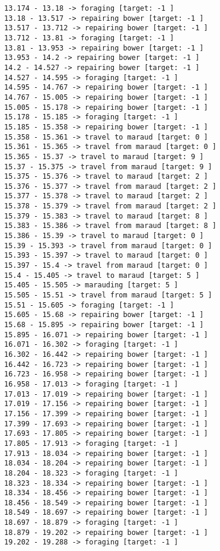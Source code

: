 \documentclass[11pt]{article}
\begin{document}
\begin{Verbatim}[commandchars=\\\{\}]
13.174 - 13.18 -> foraging [target: -1 ]
13.18 - 13.517 -> repairing bower [target: -1 ]
13.517 - 13.712 -> repairing bower [target: -1 ]
13.712 - 13.81 -> foraging [target: -1 ]
13.81 - 13.953 -> repairing bower [target: -1 ]
13.953 - 14.2 -> repairing bower [target: -1 ]
14.2 - 14.527 -> repairing bower [target: -1 ]
14.527 - 14.595 -> foraging [target: -1 ]
14.595 - 14.767 -> repairing bower [target: -1 ]
14.767 - 15.005 -> repairing bower [target: -1 ]
15.005 - 15.178 -> repairing bower [target: -1 ]
15.178 - 15.185 -> foraging [target: -1 ]
15.185 - 15.358 -> repairing bower [target: -1 ]
15.358 - 15.361 -> travel to maraud [target: 0 ]
15.361 - 15.365 -> travel from maraud [target: 0 ]
15.365 - 15.37 -> travel to maraud [target: 9 ]
15.37 - 15.375 -> travel from maraud [target: 9 ]
15.375 - 15.376 -> travel to maraud [target: 2 ]
15.376 - 15.377 -> travel from maraud [target: 2 ]
15.377 - 15.378 -> travel to maraud [target: 2 ]
15.378 - 15.379 -> travel from maraud [target: 2 ]
15.379 - 15.383 -> travel to maraud [target: 8 ]
15.383 - 15.386 -> travel from maraud [target: 8 ]
15.386 - 15.39 -> travel to maraud [target: 0 ]
15.39 - 15.393 -> travel from maraud [target: 0 ]
15.393 - 15.397 -> travel to maraud [target: 0 ]
15.397 - 15.4 -> travel from maraud [target: 0 ]
15.4 - 15.405 -> travel to maraud [target: 5 ]
15.405 - 15.505 -> marauding [target: 5 ]
15.505 - 15.51 -> travel from maraud [target: 5 ]
15.51 - 15.605 -> foraging [target: -1 ]
15.605 - 15.68 -> repairing bower [target: -1 ]
15.68 - 15.895 -> repairing bower [target: -1 ]
15.895 - 16.071 -> repairing bower [target: -1 ]
16.071 - 16.302 -> foraging [target: -1 ]
16.302 - 16.442 -> repairing bower [target: -1 ]
16.442 - 16.723 -> repairing bower [target: -1 ]
16.723 - 16.958 -> repairing bower [target: -1 ]
16.958 - 17.013 -> foraging [target: -1 ]
17.013 - 17.019 -> repairing bower [target: -1 ]
17.019 - 17.156 -> repairing bower [target: -1 ]
17.156 - 17.399 -> repairing bower [target: -1 ]
17.399 - 17.693 -> repairing bower [target: -1 ]
17.693 - 17.805 -> repairing bower [target: -1 ]
17.805 - 17.913 -> foraging [target: -1 ]
17.913 - 18.034 -> repairing bower [target: -1 ]
18.034 - 18.204 -> repairing bower [target: -1 ]
18.204 - 18.323 -> foraging [target: -1 ]
18.323 - 18.334 -> repairing bower [target: -1 ]
18.334 - 18.456 -> repairing bower [target: -1 ]
18.456 - 18.549 -> repairing bower [target: -1 ]
18.549 - 18.697 -> repairing bower [target: -1 ]
18.697 - 18.879 -> foraging [target: -1 ]
18.879 - 19.202 -> repairing bower [target: -1 ]
19.202 - 19.288 -> foraging [target: -1 ]

\end{Verbatim}
\end{document}
